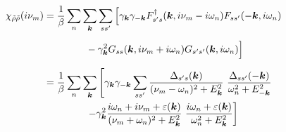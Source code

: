 \documentclass[a4j]{jsarticle}
\begin{document}
\begin{align}
	\chi_{\tilde{\rho} \tilde{\rho}}(i \nu_{m})
	&=
	\dfrac{1}{\beta}
	\sum_{n}
	\sum_{ \bm{k} }
	\sum_{s s'}
	\Big[
		\gamma_{\bm{k}}
		\gamma_{-\bm{k}}
		F_{ s' s }^{\dagger}( \bm{k} , i \nu_{m} - i \omega_{n} )
		F_{ s s' } ( - \bm{k} , i \omega_{n} )
	\nonumber \\[2mm] & \hspace{15mm} -
		\gamma_{\bm{k}}^{2}
		G_{ s s } ( \bm{k} , i \nu_{m} + i \omega_{n} )
		G_{ s' s' } ( \bm{k} , i \omega_{n} )
	\Big]
	\nonumber \\[2mm]
	&=
	\dfrac{1}{\beta}
	\sum_{n}
	\sum_{ \bm{k} }
	\left[
		\gamma_{\bm{k}}
		\gamma_{-\bm{k}}
		\sum_{s s'}
		\dfrac{ \Delta_{s' s}(\bm{k}) }{ ( \nu_{m} - \omega_{n} )^{2} + E_{\bm{k}}^{2} }
		\
		\dfrac{ \Delta_{s s'}(-\bm{k}) }{ \omega_{n}^{2} + E_{-\bm{k}}^{2} }
		\right.
	\nonumber \\ & \hspace{15mm} \left.
		-
		\gamma_{\bm{k}}^{2}
		\dfrac{ i \omega_{n} + i \nu_{m} + \varepsilon(\bm{k}) }{ ( \nu_{m} + \omega_{n} )^{2} + E_{\bm{k}}^{2} }
		\
		\dfrac{ i \omega_{n} + \varepsilon(\bm{k}) }{ \omega_{n}^{2} + E_{\bm{k}}^{2} }
		\right]
\end{align}
\end{document}
